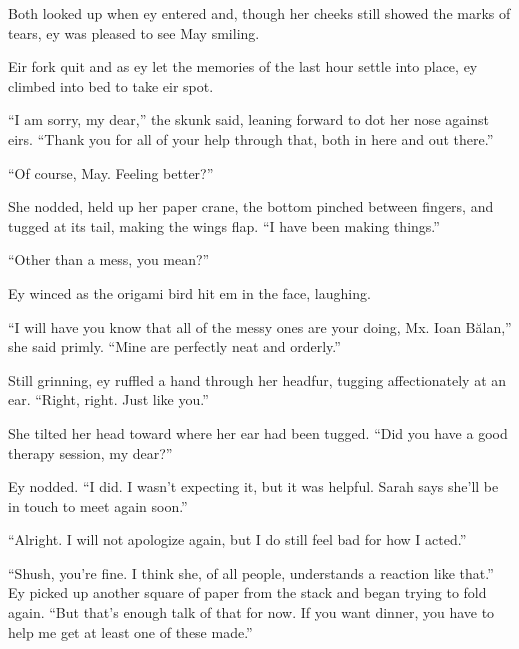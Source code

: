 Both looked up when ey entered and, though her cheeks still showed the marks of tears, ey was pleased to see May smiling.

Eir fork quit and as ey let the memories of the last hour settle into place, ey climbed into bed to take eir spot.

``I am sorry, my dear,'' the skunk said, leaning forward to dot her nose against eirs. ``Thank you for all of your help through that, both in here and out there.''

``Of course, May. Feeling better?''

She nodded, held up her paper crane, the bottom pinched between fingers, and tugged at its tail, making the wings flap. ``I have been making things.''

``Other than a mess, you mean?''

Ey winced as the origami bird hit em in the face, laughing.

``I will have you know that all of the messy ones are your doing, Mx. Ioan Bălan,'' she said primly. ``Mine are perfectly neat and orderly.''

Still grinning, ey ruffled a hand through her headfur, tugging affectionately at an ear. ``Right, right. Just like you.''

She tilted her head toward where her ear had been tugged. ``Did you have a good therapy session, my dear?''

Ey nodded. ``I did. I wasn't expecting it, but it was helpful. Sarah says she'll be in touch to meet again soon.''

``Alright. I will not apologize again, but I do still feel bad for how I acted.''

``Shush, you're fine. I think she, of all people, understands a reaction like that.'' Ey picked up another square of paper from the stack and began trying to fold again. ``But that's enough talk of that for now. If you want dinner, you have to help me get at least one of these made.''
